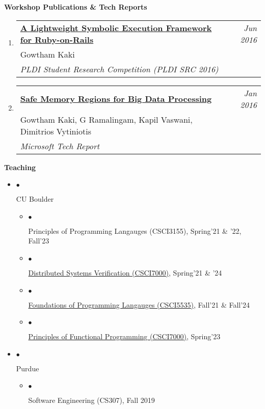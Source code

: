 \documentclass[10pt]{article}
\makeatletter
\newcommand{\lbar}[1]{{\color{#1}\ding{118}}\hspace*{2pt}}
\newenvironment{benumerate}[2]{
    \let\oldItem\item
    \def\item{\addtocounter{enumi}{-2}\oldItem}
    \begin{enumerate}[#2] \itemsep3pt
    \setcounter{enumi}{#1}
    \addtocounter{enumi}{1}} 
  {\end{enumerate}}
\newcommand{\service}[1]{\item $\bullet$ \hspace{1ex}\parbox{7.2in}{#1}}
\newenvironment{publication}[5]
{ \item
  \begin{tabular*}{7.5in}{p{6.3in}@{\extracolsep{\fill}}r}
    \href{#1}{\textbf{#2}} & \textit{#3}\\ #4 &\\ \textit{#5}&\\
  \end{tabular*}
} {}
\newenvironment{region}[3]{%
  \vspace*{0.5ex}
  {{\textbf{\large{#1}}}}
  \begin{benumerate}{#3}{\color{RoyalBlue}#2}}
  {\end{benumerate}\vspace{0.8ex}}
\newenvironment{itemregion}[1]{
  \vspace*{0.5ex}
  {{\textbf{\large{#1}}}}
  \begin{itemize}\itemsep1pt}
  {\end{itemize}\vspace{0.8ex}}
\makeatother
\begin{document}
\begin{region} {\lbar{Mahogany}Workshop Publications \& Tech Reports}{{W}1}{5}
  \begin{publication}{http://purduepl.github.io/docs/maglev.pdf}
    {A Lightweight Symbolic Execution Framework for Ruby-on-Rails}
    {Jun 2016}{Gowtham Kaki} {PLDI Student Research Competition (PLDI SRC 2016)}
  \end{publication}

  \begin{publication}{https://www.microsoft.com/en-us/research/publication/safe-memory-regions-big-data-processing}
    {Safe Memory Regions for Big Data Processing}
    {Jan 2016}{Gowtham Kaki, G Ramalingam, Kapil Vaswani, Dimitrios
    Vytiniotis} {Microsoft Tech Report}
  \end{publication}

\end{region}

\begin{itemregion}{\lbar{Mahogany}Teaching}
  \service{CU Boulder}
  \begin{itemize}
    \service{Principles of Programming Langauges (CSCI3155), Spring'21 \& '22, Fall'23}
    \service{\href{https://gowthamk.github.io/csci7000_s21/}{Distributed Systems Verification (CSCI7000)}, Spring'21 \& '24}
    \service{\href{https://csci5535.github.io/}{Foundations of
    Programming Langauges (CSCI5535)}, Fall'21 \& Fall'24}
    \service{\href{https://gowthamk.github.io/csci7000_pfp_s23/}{Principles of Functional Programming (CSCI7000)}, Spring'23}
  \end{itemize}
  \service{Purdue}
  \begin{itemize}
    \service{Software Engineering (CS307), Fall 2019}
  \end{itemize}
\end{itemregion}
\end{document}
